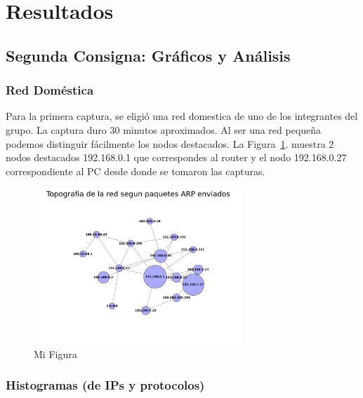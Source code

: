 \section{Resultados}

\subsection{Segunda Consigna: Gráficos y Análisis}

\subsubsection{Red Doméstica}

Para la primera captura, se eligió una red domestica de uno de los integrantes del grupo.
La captura duro 30 minutos aproximados.
Al ser una red pequeña podemos distinguir fácilmente los nodos destacados.
La Figura~\ref{fig:red_domestica_network}. muestra 2 nodos destacados 192.168.0.1 que correspondes al router  y el nodo 192.168.0.27 correspondiente al PC desde donde se tomaron las capturas.

\begin{figure}[h!]
  \centering
   \includegraphics[width=0.7\textwidth]{graficos/red_domestica_network.png}
  \caption{Mi Figura}
  \label{fig:red_domestica_network}
\end{figure}

\FloatBarrier

\subsubsection{Histogramas (de IPs y protocolos)}

